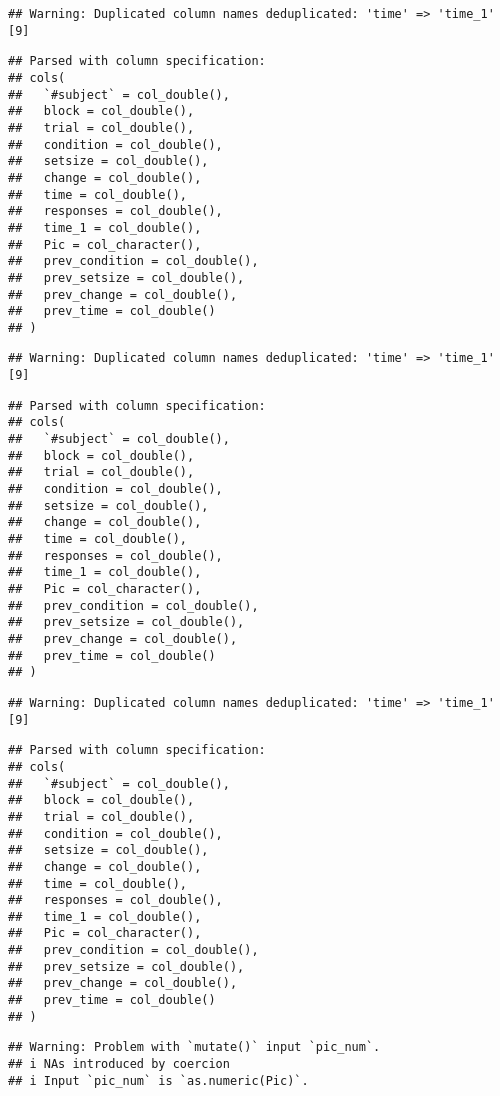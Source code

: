\documentclass[
]{article}
\begin{document}
\begin{verbatim}
## Warning: Duplicated column names deduplicated: 'time' => 'time_1' [9]
\end{verbatim}

\begin{verbatim}
## Parsed with column specification:
## cols(
##   `#subject` = col_double(),
##   block = col_double(),
##   trial = col_double(),
##   condition = col_double(),
##   setsize = col_double(),
##   change = col_double(),
##   time = col_double(),
##   responses = col_double(),
##   time_1 = col_double(),
##   Pic = col_character(),
##   prev_condition = col_double(),
##   prev_setsize = col_double(),
##   prev_change = col_double(),
##   prev_time = col_double()
## )
\end{verbatim}

\begin{verbatim}
## Warning: Duplicated column names deduplicated: 'time' => 'time_1' [9]
\end{verbatim}

\begin{verbatim}
## Parsed with column specification:
## cols(
##   `#subject` = col_double(),
##   block = col_double(),
##   trial = col_double(),
##   condition = col_double(),
##   setsize = col_double(),
##   change = col_double(),
##   time = col_double(),
##   responses = col_double(),
##   time_1 = col_double(),
##   Pic = col_character(),
##   prev_condition = col_double(),
##   prev_setsize = col_double(),
##   prev_change = col_double(),
##   prev_time = col_double()
## )
\end{verbatim}

\begin{verbatim}
## Warning: Duplicated column names deduplicated: 'time' => 'time_1' [9]
\end{verbatim}

\begin{verbatim}
## Parsed with column specification:
## cols(
##   `#subject` = col_double(),
##   block = col_double(),
##   trial = col_double(),
##   condition = col_double(),
##   setsize = col_double(),
##   change = col_double(),
##   time = col_double(),
##   responses = col_double(),
##   time_1 = col_double(),
##   Pic = col_character(),
##   prev_condition = col_double(),
##   prev_setsize = col_double(),
##   prev_change = col_double(),
##   prev_time = col_double()
## )
\end{verbatim}

\begin{verbatim}
## Warning: Problem with `mutate()` input `pic_num`.
## i NAs introduced by coercion
## i Input `pic_num` is `as.numeric(Pic)`.
\end{verbatim}
\end{document}
